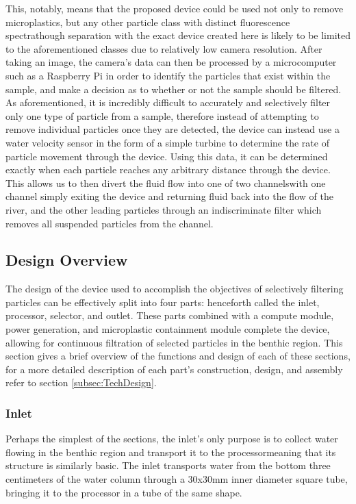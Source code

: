\documentclass[fleqn,10pt]{SelfArx} %
\begin{document}
		This, notably, means that the proposed device could be used not only to remove microplastics, but any other particle class with distinct fluorescence spectra\textemdash though separation with the exact device created here is likely to be limited to the aforementioned classes due to relatively low camera resolution. After taking an image, the camera’s data can then be processed by a microcomputer such as a Raspberry Pi in order to identify the particles that exist within the sample, and make a decision as to whether or not the sample should be filtered. As aforementioned, it is incredibly difficult to accurately and selectively filter only one type of particle from a sample, therefore instead of attempting to remove individual particles once they are detected, the device can instead use a water velocity sensor in the form of a simple turbine to determine the rate of particle movement through the device. Using this data, it can be determined exactly when each particle reaches any arbitrary distance through the device. This allows us to then divert the fluid flow into one of two channels\textemdash with one channel simply exiting the device and returning fluid back into the flow of the river, and the other leading particles through an indiscriminate filter which removes all suspended particles from the channel. 
	
	\subsection{Design Overview}
	The design of the device used to accomplish the objectives of selectively filtering particles can be effectively split into four parts: henceforth called the inlet, processor, selector, and outlet. These parts combined with a compute module, power generation, and microplastic containment module complete the device, allowing for continuous filtration of selected particles in the benthic region. This section gives a brief overview of the functions and design of each of these sections, for a more detailed description of each part’s construction, design, and assembly refer to  section \ref{subsec:TechDesign}.
	
	\subsubsection{Inlet}
	Perhaps the simplest of the sections, the inlet’s only purpose is to collect water flowing in the benthic region and transport it to the processor\textemdash meaning that its structure is similarly basic. The inlet transports water from the bottom three centimeters of the water column through a 30x30mm inner diameter square tube, bringing it to the processor in a tube of the same shape.
	
\end{document}
